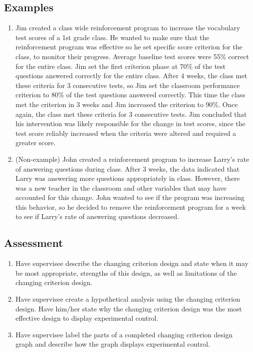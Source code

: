 \subsection{Examples}
\begin{enumerate}
\item Jim created a class wide reinforcement program to increase the vocabulary test scores of a 1st grade class. He wanted to make sure that the reinforcement program was effective so he set specific score criterion for the class, to monitor their progress. Average baseline test scores were 55\% correct for the entire class. Jim set the first criterion phase at 70\% of the test questions answered correctly for the entire class. After 4 weeks, the class met these criteria for 3 consecutive tests, so Jim set the classroom performance criterion to 80\% of the test questions answered correctly. This time the class met the criterion in 3 weeks and Jim increased the criterion to 90\%. Once again, the class met these criteria for 3 consecutive tests. Jim concluded that his intervention was likely responsible for the change in test scores, since the test score reliably increased when the criteria were altered and required a greater score.
\item (Non-example) John created a reinforcement program to increase Larry's rate of answering questions during class. After 3 weeks, the data indicated that Larry was answering more questions appropriately in class. However, there was a new teacher in the classroom and other variables that may have accounted for this change. John wanted to see if the program was increasing this behavior, so he decided to remove the reinforcement program for a week to see if Larry's rate of answering questions decreased.
\end{enumerate}
%
\subsection{Assessment}
\begin{enumerate}
\item Have supervisee describe the changing criterion design and state when it may be most appropriate, strengths of this design, as well as limitations of the changing criterion design.
\item Have supervisee create a hypothetical analysis using the changing criterion design. Have him/her state why the changing criterion design was the most effective design to display experimental control.
\item Have supervisee label the parts of a completed changing criterion design graph and describe how the graph displays experimental control. 
\end{enumerate}
%
